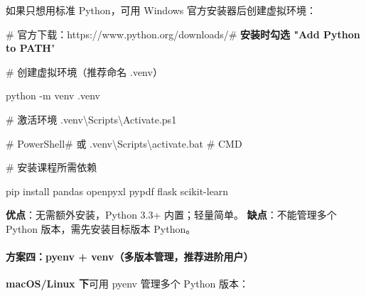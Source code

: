 \documentclass[
  american,
  chinese,
]{ctexart}
\begin{document}
{\foreignlanguage{american}{如果只想用标准}}\foreignlanguage{american}{ {Python{，可用}}
Windows }{\foreignlanguage{american}{官方安装器后创建虚拟环境}}\foreignlanguage{american}{：}

\foreignlanguage{american}{\# }{\foreignlanguage{american}{官方下载：}\foreignlanguage{american}{https}}\foreignlanguage{american}{://www.python.org/downloads/\# }{\textbf{\foreignlanguage{american}{安装时勾选}}}\textbf{\foreignlanguage{american}{ "Add Python to PATH}}\foreignlanguage{american}{"}

\foreignlanguage{american}{\# }{创建虚拟环境（推荐命名}\foreignlanguage{american}{ .{venv}}{）}{ \foreignlanguage{american}{}}

\foreignlanguage{american}{python -m {{venv}}{ .{venv}} }

\foreignlanguage{american}{\# }{\foreignlanguage{american}{激活环境}}\foreignlanguage{american}{ .{venv}\textbackslash Scripts\textbackslash Activate.ps1{~~ }}

\foreignlanguage{american}{\# PowerShell\# }\foreignlanguage{american}{或}\foreignlanguage{american}{ .{venv}\textbackslash Scripts\textbackslash activate.bat
\# CMD}

\foreignlanguage{american}{\# }{\foreignlanguage{american}{安装课程所需依赖}}\foreignlanguage{american}{ }

\foreignlanguage{american}{pip install
pandas {openpyxl} {pypdf} flask
scikit-learn}

\textbf{{优点}}{：无需额外安装，}\foreignlanguage{american}{Python 3.3+ }{内置；轻量简单。}\foreignlanguage{american}{\hfill\break
}{\textbf{\foreignlanguage{american}{缺点}}\foreignlanguage{american}{：不能管理多个}}\foreignlanguage{american}{ Python }{\foreignlanguage{american}{版本，需先安装目标版本}}\foreignlanguage{american}{ Python}\foreignlanguage{american}{。}

\paragraph{\texorpdfstring{{\foreignlanguage{american}{方案四：}\foreignlanguage{american}{pyenv}}\foreignlanguage{american}{ + {venv{（多版本管理，推荐进阶用户}}}\foreignlanguage{american}{）}}{方案四：pyenv + venv（多版本管理，推荐进阶用户）}}\label{ux65b9ux6848ux56dbpyenv-venvux591aux7248ux672cux7ba1ux7406ux63a8ux8350ux8fdbux9636ux7528ux6237}

\textbf{\foreignlanguage{american}{macOS/Linux }}{\textbf{\foreignlanguage{american}{下}}\foreignlanguage{american}{可用}}\foreignlanguage{american}{ {pyenv} }{\foreignlanguage{american}{管理多个}}\foreignlanguage{american}{ Python }{\foreignlanguage{american}{版本}}\foreignlanguage{american}{：}
\end{document}

